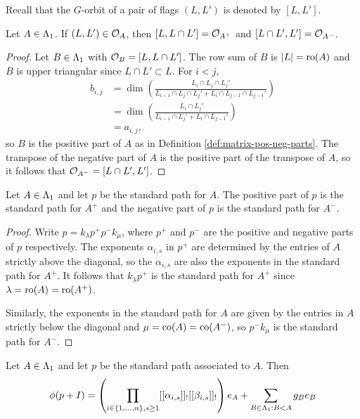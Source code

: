 \documentclass[a4paper, 11pt]{report}
\begin{document}
Recall that the $G$-orbit of a pair of flags $(L,L')$ is denoted by $[L,L']$.

\begin{lemma}\label{lemma:pos-neg-orbits}
Let $A\in\Lambda_1{}$. If $(L,L')\in\mathcal{O}_{A}$, then $[L,L\cap L']=\mathcal{O}_{A^+}$ and $[L\cap L',L']=\mathcal{O}_{A^-}$.
\end{lemma}

\begin{proof}
Let $B\in\Lambda_1{}$ with $\mathcal{O}_{B} = [L,L\cap L']$. The row sum of $B$ is $|L|=\operatorname{ro}(A)$ and $B$ is upper triangular since $L\cap L'\subset L$. For $i<j$,
\begin{align*}
b_{i,j}
&= \dim\left(\frac{L_i\cap L_j\cap L_j'}{L_{i-1}\cap L_j\cap L_j' + L_i\cap L_{j-1}\cap L_{j-1}'}\right)\\
&= \dim\left(\frac{L_i\cap L_j'}{L_{i-1}\cap L_j' + L_i\cap L_{j-1}'}\right)\\
&= a_{i,j},
\end{align*}
so $B$ is the positive part of $A$ as in Definition \ref{def:matrix-pos-neg-parts}. The transpose of the negative part of $A$ is the positive part of the transpose of $A$, so it follows that $\mathcal{O}_{A^-}=[L\cap L',L']$.
\end{proof}

\begin{lemma}\label{lemma:pos-neg-path-to-matrix}
Let $A\in\Lambda_1{}$ and let $p$ be the standard path for $A$. The positive part of $p$ is the standard path for $A^+$ and the negative part of $p$ is the standard path for $A^-$.
\end{lemma}

\begin{proof}
Write $p=k_\lambda p^+ p^-k_\mu$, where $p^+$ and $p^-$ are the positive and negative parts of $p$ respectively. The exponents $\alpha_{i,s}$ in $p^+$ are determined by the entries of $A$ strictly above the diagonal, so the $\alpha_{i,s}$ are also the exponents in the standard path for $A^+$. It follows that $k_\lambda p^+$ is the standard path for $A^+$ since $\lambda=\operatorname{ro}(A)=\operatorname{ro}(A^+)$.

Similarly, the exponents in the standard path for $A$ are given by the entries in $A$ strictly below the diagonal and $\mu=\operatorname{co}(A)=\operatorname{co}(A^-)$, so $p^- k_\mu$ is the standard path for $A^-$.
\end{proof}

\begin{proposition}\label{proposition:image-of-standard-path}
Let $A\in\Lambda_1{}$ and let $p$ be the standard path associated to $A$. Then
\begin{equation*}
\phi(p+I) = \left(\prod_{i\in\{1,\ldots,n\},s\geq 1} [[\alpha_{i,s}]]_![[\beta_{i,s}]]_!\right) e_A + \sum_{B\in\Lambda_1{}:B<A} g_Be_B
\end{equation*}
\end{proposition}
\end{document}

